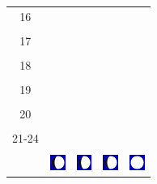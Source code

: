 \documentclass[a4paper,12pt, tikz]{scrartcl}
\begin{document}
\begin{tabularx}{\linewidth}{|c|X|X|p{2cm}|p{2cm}|}
            &   &       &    &   \\
          \hline
          16&   &                 &    &   \\
            &   &       &    &   \\
          \hline
          17&   &                 &    &   \\
            &   &       &    &   \\
          \hline
          18&   &                 &    &   \\
            &   &       &    &   \\
          \hline
          19&   &                 &     &   \\
            &   &       &    &   \\
          \hline
          20&   &              &    &   \\
            &   &       &    &   \\
          \hline 
          21-24&   &              &    &   \\
            &   &       &    &   \\
          \hline
                      & \vspace{0.01cm} \centerline{\includegraphics[width=0.5cm]{moon_phases/Moon_phase_3.svg.png}} \vspace{0.1cm} & \vspace{0.01cm} \centerline{\includegraphics[width=0.5cm]{moon_phases/Moon_phase_3.svg.png}} \vspace{0.1cm} & \vspace{0.01cm} \centerline{\includegraphics[width=0.5cm]{moon_phases/Moon_phase_3.svg.png}} \vspace{0.1cm} & \vspace{0.01cm} \centerline{\includegraphics[width=0.5cm]{moon_phases/Moon_phase_4.svg.png}} \vspace{0.1cm}\\
          \hline    
        \end{tabularx}
\end{document}

